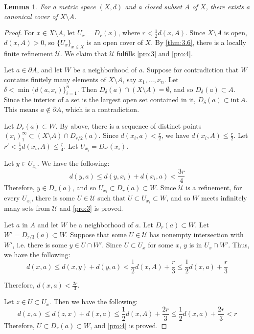 \documentclass[openany, amssymb, psamsfonts]{amsart}
\let\fullref\autoref
\newtheorem{lem}{Lemma}[section]
\theoremstyle{definition}
\numberwithin{equation}{section}
\begin{document}
\begin{lem}\label{lem:3.25}
  For a metric space $(X,d)$ and a closed subset $A$ of $X$, there exists a canonical cover of $X \setminus A$.
\end{lem}
\begin{proof}
  For $x \in X \setminus A$, let $U_x = D_r(x)$, where $r < \frac12 d(x,A)$. Since $X\setminus A$ is open, $d(x,A) > 0$, so $\{U_x\}_{x\in X}$ is an open cover of $X$. By \fullref{thm:3.6}, there is a locally finite refinement $\mathcal{U}$. We claim that $\mathcal{U}$ fulfills \ref{pro:3} and \ref{pro:4}. 

  Let $a \in \partial A$, and let $W$ be a neighborhood of $a$. Suppose for contradiction that $W$ contains finitely many elements of $X\setminus A$, say $x_1,\ldots, x_n$. Let $\delta < \min \{d(a, x_i)\}_{i=1}^n$. Then $D_\delta(a) \cap (X\setminus A) = \emptyset$, and so $D_\delta(a) \subset A$. Since the interior of a set is the largest open set contained in it, $D_\delta(a) \subset \mathrm{int\, } A$. This means $a \not\in \partial A$, which is a contradiction. 

  Let $D_r(a) \subset W$. By above, there is a sequence of distinct points $(x_i)_1^\infty \subset (X \setminus A)\cap D_{r/2}(a)$. Since $d(x_i, a) < \frac{r}2$, we have $d(x_i, A) \le \frac{r}2$. Let $r' < \frac12 d(x_i, A) \le \frac{r}4$. Let $U_{x_i} = D_{r'}(x_i)$. 

  Let $y \in U_{x_i}$. We have the following:
  \[
    d(y,a) \le d(y,x_i) + d(x_i, a) < \frac{3r}{4}
  \]
  Therefore, $y \in D_r(a)$, and so $U_{x_i} \subset D_r(a) \subset W$. Since $\mathcal{U}$ is a refinement, for every $U_{x_i}$, there is some $U \in \mathcal{U}$ such that $U \subset U_{x_i} \subset W$, and so $W$ meets infinitely many sets from $\mathcal{U}$ and \ref{pro:3} is proved. 

  Let $a$ in $A$ and let $W$ be a neighborhood of $a$. Let $D_r(a) \subset W$. Let $W' = D_{r/3}(a) \subset W$. Suppose that some $U \in \mathcal{U}$ has nonempty intersection with $W'$, i.e. there is some $y \in U \cap W'$. Since $U \subset U_x$ for some $x$, $y$ is in $U_x \cap W'$. Thus, we have the following:
  \[
    d(x,a) \le d(x,y) + d(y,a) < \frac12 d(x,A) + \frac{r}3 \le \frac12 d(x,a) + \frac{r}3
  \]

  Therefore, $d(x,a) < \frac{2r}3$. 

  Let $z \in U \subset U_x$. Then we have the following:
  \[
    d(z,a) \le d(z,x) + d(x,a) \le \frac12 d(x,A) + \frac{2r}3 \le \frac12 d(x,a) + \frac{2r}3 < r
  \]
  Therefore, $U \subset D_r(a) \subset W$, and \ref{pro:4} is proved.
\end{proof}
\end{document}
